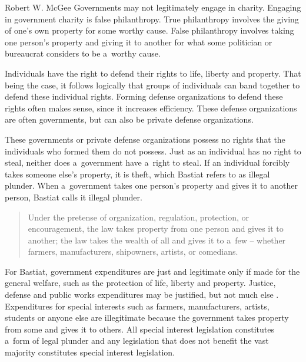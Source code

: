 \begin{artengenv}{Robert W. McGee}
Governments may not legitimately engage in charity. Engaging in government charity is false philanthropy. True philanthropy involves the giving of one's own property for some worthy cause. False philanthropy involves taking one person's property and giving it to another for what some politician or bureaucrat considers to be a~worthy cause.



Individuals have the right to defend their rights to life, liberty and property. That being the case, it follows logically that groups of individuals can band together to defend these individual rights. Forming defense organizations to defend these rights often makes sense, since it increases efficiency. These defense organizations are often governments, but can also be private defense organizations.



These governments or private defense organizations possess no rights that the individuals who formed them do not possess. Just as an individual has no right to steal, neither does a~government have a~right to steal. If an individual forcibly takes someone else's property, it is theft, which Bastiat refers to as illegal plunder. When a~government takes one person's property and gives it to another person, Bastiat calls it illegal plunder.



\begin{quote}
Under the pretense of organization, regulation, protection, or encouragement, the law takes property from one person and gives it to another; the law takes the wealth of all and gives it to a~few -- whether farmers, manufacturers, shipowners, artists, or comedians. 
\parencite[][p.13]{bastiat_law_1998}%
\end{quote}




For Bastiat, government expenditures are just and legitimate only if made for the general welfare, such as the protection of life, liberty and property. Justice, defense and public works expenditures may be justified, but not much else 
\parencite[][]{braun_bastiat_2011}. %
 Expenditures for special interests such as farmers, manufacturers, artists, students or anyone else are illegitimate because the government takes property from some and gives it to others. All special interest legislation constitutes a~form of legal plunder and any legislation that does not benefit the vast majority constitutes special interest legislation.




\end{artengenv}
